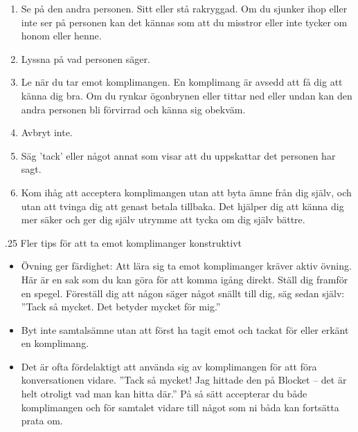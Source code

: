 \documentclass[swedish,a4paper]{book}
\makeatletter
\renewcommand\subsubsection{\@startsection{subsubsection}{1}{\z@}%
                                   {\baselineskip}%
                                   {.25\baselineskip}%
                                   {\fontsize{1\baselineskip}{1.25\baselineskip}\selectfont\sffamily\color{accent}\bfseries}} %
\makeatother
\begin{document}
\begin{enumerate}

\item Se på den andra personen. Sitt eller stå rakryggad. Om du sjunker ihop eller inte ser på personen kan det kännas som att du misstror eller inte tycker om honom eller henne.

\item Lyssna på vad personen säger.

\item Le när du tar emot komplimangen. En komplimang är avsedd att få dig att känna dig bra. Om du rynkar ögonbrynen eller tittar ned eller undan kan den andra personen bli förvirrad och känna sig obekväm.

\item Avbryt inte.

\item Säg 'tack' eller något annat som visar att du uppskattar det personen har sagt.

\item Kom ihåg att acceptera komplimangen utan att byta ämne från dig själv, och utan att tvinga dig att genast betala tillbaka. Det hjälper dig att känna dig mer säker och ger dig själv utrymme att tycka om dig själv bättre.

\end{enumerate}

\subsubsection{Fler tips för att ta emot komplimanger konstruktivt}

\begin{itemize}

\item Övning ger färdighet: Att lära sig ta emot komplimanger kräver aktiv övning. Här är en sak som du kan göra för att komma igång direkt. Ställ dig framför en spegel. Föreställ dig att någon säger något snällt till dig, säg sedan själv: ''Tack så mycket. Det betyder mycket för mig.''

\item Byt inte samtalsämne utan att först ha tagit emot och tackat för eller erkänt en komplimang.

\item Det är ofta fördelaktigt att använda sig av komplimangen för att föra konversationen vidare. ''Tack så mycket! Jag hittade den på Blocket -- det är helt otroligt vad man kan hitta där.'' På så sätt accepterar du både komplimangen och för samtalet vidare till något som ni båda kan fortsätta prata om.

\end{itemize}
\end{document}

